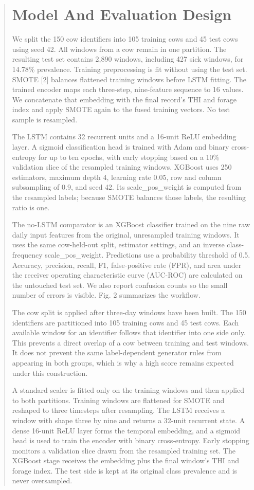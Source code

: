\documentclass[journal]{IEEEtran}
\begin{document}
\begin{abstract}
\section{Model And Evaluation Design}

We split the 150 cow identifiers into 105 training cows and 45 test cows using seed 42. All windows from a cow remain in one partition. The resulting test set contains 2,890 windows, including 427 sick windows, for 14.78\% prevalence. Training preprocessing is fit without using the test set. SMOTE [2] balances flattened training windows before LSTM fitting. The trained encoder maps each three-step, nine-feature sequence to 16 values. We concatenate that embedding with the final record's THI and forage index and apply SMOTE again to the fused training vectors. No test sample is resampled.

The LSTM contains 32 recurrent units and a 16-unit ReLU embedding layer. A sigmoid classification head is trained with Adam and binary cross-entropy for up to ten epochs, with early stopping based on a 10\% validation slice of the resampled training windows. XGBoost uses 250 estimators, maximum depth 4, learning rate 0.05, row and column subsampling of 0.9, and seed 42. Its scale\_pos\_weight is computed from the resampled labels; because SMOTE balances those labels, the resulting ratio is one.

The no-LSTM comparator is an XGBoost classifier trained on the nine raw daily input features from the original, unresampled training windows. It uses the same cow-held-out split, estimator settings, and an inverse class-frequency scale\_pos\_weight. Predictions use a probability threshold of 0.5. Accuracy, precision, recall, F1, false-positive rate (FPR), and area under the receiver operating characteristic curve (AUC-ROC) are calculated on the untouched test set. We also report confusion counts so the small number of errors is visible. Fig. 2 summarizes the workflow.

The cow split is applied after three-day windows have been built. The 150 identifiers are partitioned into 105 training cows and 45 test cows. Each available window for an identifier follows that identifier into one side only. This prevents a direct overlap of a cow between training and test windows. It does not prevent the same label-dependent generator rules from appearing in both groups, which is why a high score remains expected under this construction.

A standard scaler is fitted only on the training windows and then applied to both partitions. Training windows are flattened for SMOTE and reshaped to three timesteps after resampling. The LSTM receives a window with shape three by nine and returns a 32-unit recurrent state. A dense 16-unit ReLU layer forms the temporal embedding, and a sigmoid head is used to train the encoder with binary cross-entropy. Early stopping monitors a validation slice drawn from the resampled training set. The XGBoost stage receives the embedding plus the final window's THI and forage index. The test side is kept at its original class prevalence and is never oversampled.


\end{abstract}
\end{document}
